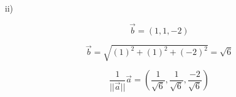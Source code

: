 

{ii)} 

$$\overrightarrow{b} = (1, 1, -2)$$

$$\overrightarrow{b} = \sqrt{(1)^2 + (1)^2 + (-2)^2} = \sqrt{6}$$

$$\frac{1}{||\overrightarrow{a}||}\overrightarrow{a} = \left(\frac{1}{\sqrt{6}}, \frac{1}{\sqrt{6}}, \frac{-2}{\sqrt{6}}\right)$$

